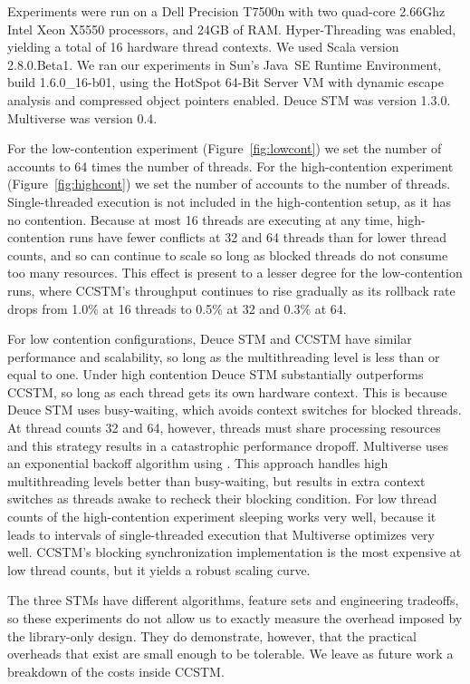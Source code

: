 Experiments were run on a Dell Precision T7500n with two quad-core
2.66Ghz Intel Xeon X5550 processors, and 24GB of RAM.  Hyper-Threading was
enabled, yielding a total of 16 hardware thread contexts.  We used Scala
version 2.8.0.Beta1.  We ran our experiments in
Sun's Java~SE Runtime Environment, build 1.6.0\_16-b01, using the HotSpot
64-Bit Server VM with dynamic escape analysis and compressed object pointers
enabled.  Deuce STM was version 1.3.0.  Multiverse was version 0.4.

For the low-contention
experiment (Figure~\ref{fig:lowcont}) we set the number of accounts
to 64 times the number of threads.  For the high-contention experiment
(Figure~\ref{fig:highcont}) we set the number of accounts to the number of
threads.  Single-threaded execution is not included in the high-contention
setup, as it has no contention.  Because at most 16 threads are executing
at any time, high-contention runs have fewer conflicts at 32 and 64
threads than for lower thread counts, and so can continue to scale so long as
blocked threads do not consume too many resources.  This effect is present
to a lesser degree for the low-contention runs, where CCSTM's throughput
continues to rise gradually as its rollback rate
drops from 1.0\% at 16 threads to 0.5\% at 32 and 0.3\% at 64.

For low contention configurations, Deuce STM and CCSTM have similar
performance and scalability, so long as the multithreading level is less
than or equal to one.  Under high contention Deuce STM substantially
outperforms CCSTM, so long as each thread gets its own hardware context.
This is because Deuce STM uses busy-waiting, which avoids context switches
for blocked threads.  At thread counts 32 and 64, however, threads must
share processing resources and this strategy results in a catastrophic
performance dropoff.  Multiverse uses an exponential backoff algorithm
using .  This approach handles high multithreading
levels better than busy-waiting, but results in extra context switches as
threads awake to recheck their blocking condition.  For low thread counts
of the high-contention experiment sleeping works very well, because
it leads to intervals of single-threaded execution that Multiverse optimizes
very well.  CCSTM's blocking synchronization implementation is the most
expensive at low thread counts, but it yields a robust scaling curve.

The three STMs have different algorithms, feature sets and engineering
tradeoffs, so these experiments do not allow us to exactly measure
the overhead imposed by the library-only design.  They do demonstrate,
however, that the practical overheads that exist are small enough to be
tolerable.  We leave as future work a breakdown of the costs inside CCSTM.

